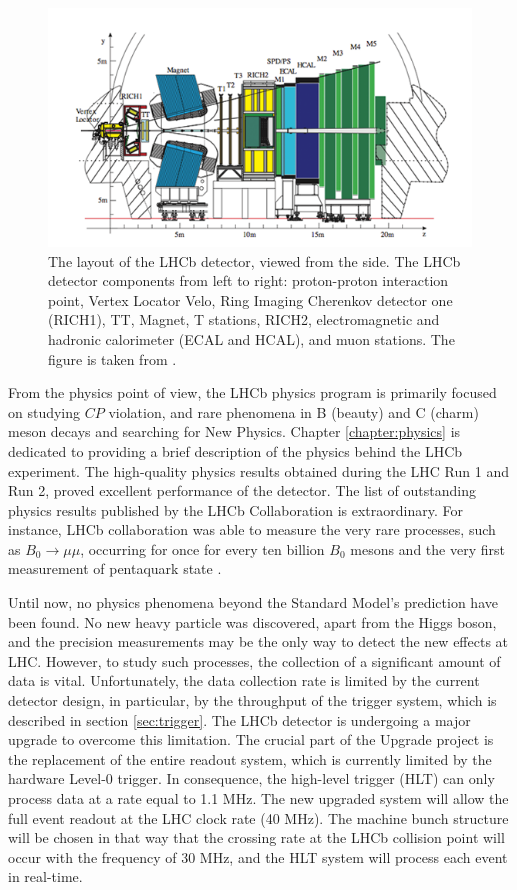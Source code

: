 \begin{figure}
\centering
\includegraphics[scale=0.6]{figures/lhcblayout.png}
\caption{The layout of the LHCb detector, viewed from the side. The LHCb detector components from left to right: proton-proton interaction point, Vertex Locator Velo, Ring Imaging Cherenkov detector one (RICH1), TT, Magnet, T stations, RICH2, electromagnetic and hadronic calorimeter (ECAL and HCAL), and muon stations. The figure is taken from \cite{lhcb}. 
\label{fig:LHCBlayout}}
\end{figure}



From the physics point of view, the LHCb physics program is primarily focused on studying $CP$ violation, and rare phenomena in B (beauty) and C (charm) meson decays and searching for New Physics. Chapter \ref{chapter:physics} is dedicated to providing a brief description of the physics behind the LHCb experiment.  
The high-quality physics results obtained during the LHC Run 1 and Run 2, proved excellent performance of the detector.
The list of outstanding physics results published by the LHCb Collaboration is extraordinary. For instance, LHCb collaboration was able to measure the very rare processes, such as $B_0\rightarrow \mu \mu$, occurring for once for every ten billion $B_0$ mesons \cite{B_mumu} and the very first measurement of pentaquark state \cite{pentaquarks}.  
  
Until now, no physics phenomena beyond the Standard Model's prediction have been found. No new heavy particle was discovered, apart from the Higgs boson, and the precision measurements may be the only way to detect the new effects at LHC. However, to study such processes, the collection of a significant amount of data is vital. Unfortunately, the data collection rate is limited by the current detector design, in particular, by the throughput of the trigger system, which is described in section \ref{sec:trigger}. The LHCb detector is undergoing a major upgrade to overcome this limitation. The crucial part of the Upgrade project is the replacement of the entire readout system, which is currently limited by the hardware Level-0 trigger.
In consequence, the high-level trigger (HLT) can only process data at a rate equal to 1.1 MHz. The new upgraded system will allow the full event readout at the LHC clock rate (40 MHz). The machine bunch structure will be chosen in that way that the crossing rate at the LHCb collision point will occur with the frequency of 30 MHz, and the HLT system will process each event in real-time.

